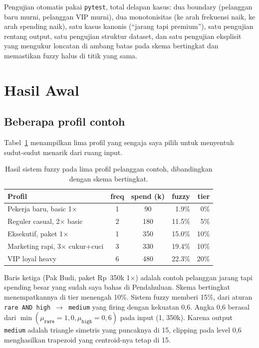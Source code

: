 \documentclass[conference]{IEEEtran}
\begin{document}
Pengujian otomatis pakai \texttt{pytest}, total delapan kasus: dua
boundary (pelanggan baru murni, pelanggan VIP murni), dua monotonisitas
(ke arah frekuensi naik, ke arah spending naik), satu kasus kanonis
(``jarang tapi premium''), satu pengujian rentang output, satu pengujian
struktur dataset, dan satu pengujian eksplisit yang mengukur loncatan di
ambang batas pada skema bertingkat dan memastikan fuzzy halus di titik
yang sama.

\section{Hasil Awal}

\subsection{Beberapa profil contoh}

Tabel~\ref{tab:scenarios} menampilkan lima profil yang sengaja saya pilih
untuk menyentuh sudut-sudut menarik dari ruang input.

\begin{table}[h]
\caption{Hasil sistem fuzzy pada lima profil pelanggan contoh, dibandingkan dengan skema bertingkat.}
\label{tab:scenarios}
\centering
\renewcommand{\arraystretch}{1.1}
\footnotesize
\begin{tabular}{p{} c c r r}
\toprule
\textbf{Profil} & \textbf{freq} & \textbf{spend (k)}
                & \textbf{fuzzy} & \textbf{tier} \\
\midrule
Pekerja baru, basic 1$\times$ & 1 & 90  & 1.9\%  & 0\%   \\
Reguler casual, 2$\times$ basic & 2 & 180 & 11.5\% & 5\%   \\
Eksekutif, paket 1$\times$    & 1 & 350 & 15.0\% & 10\%  \\
Marketing rapi, 3$\times$ cukur+cuci & 3 & 330 & 19.4\% & 10\%  \\
VIP loyal heavy               & 6 & 480 & 22.3\% & 20\%  \\
\bottomrule
\end{tabular}
\end{table}

Baris ketiga (Pak Budi, paket Rp~350k 1$\times$) adalah contoh
pelanggan jarang tapi spending besar yang sudah saya bahas di
Pendahuluan. Skema bertingkat menempatkannya di tier menengah 10\%.
Sistem fuzzy memberi 15\%, dari aturan \texttt{rare AND high $\to$
medium} yang firing dengan kekuatan 0,6. Angka 0,6 berasal dari
$\min(\mu_{\texttt{rare}}=1{,}0, \mu_{\texttt{high}}=0{,}6)$ pada input
(1, 350k). Karena output \texttt{medium} adalah triangle simetris yang
puncaknya di 15, clipping pada level 0,6 menghasilkan trapezoid yang
centroid-nya tetap di 15.
\end{document}

